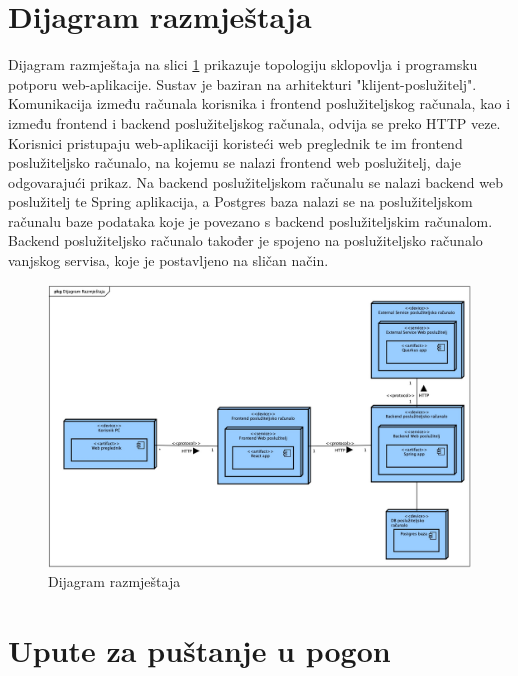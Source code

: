 			
			
			
			\eject 
		
		
		\section{Dijagram razmještaja}
			
			
			Dijagram razmještaja na slici \ref{fig:implementacija_dijagram_razmjestaja} prikazuje topologiju sklopovlja i programsku potporu web-aplikacije. Sustav je baziran na arhitekturi "klijent-poslužitelj". Komunikacija između računala korisnika i frontend poslužiteljskog računala, kao i između frontend i backend poslužiteljskog računala, odvija se preko HTTP veze. Korisnici pristupaju web-aplikaciji koristeći web preglednik te im frontend poslužiteljsko računalo, na kojemu se nalazi frontend web poslužitelj, daje odgovarajući prikaz. Na backend poslužiteljskom računalu se nalazi backend web poslužitelj te Spring aplikacija, a Postgres baza nalazi se na poslužiteljskom računalu baze podataka koje je povezano s backend poslužiteljskim računalom. Backend poslužiteljsko računalo također je spojeno na poslužiteljsko računalo vanjskog servisa, koje je postavljeno na sličan način.
			
			\begin{figure}[H]
				\includegraphics[scale=0.23]{slike/implementacija_dijagram_razmjestaja.jpg} %
				\centering
				\caption{Dijagram razmještaja}
				\label{fig:implementacija_dijagram_razmjestaja}
			\end{figure}
			
			\eject 
		
		\section{Upute za puštanje u pogon}
		
